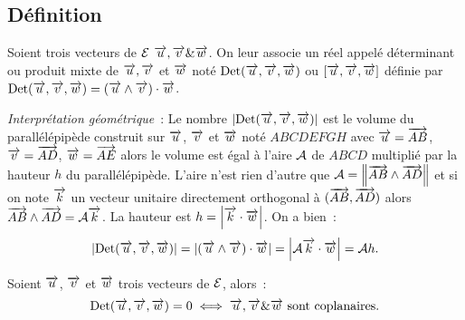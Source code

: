 \subsection{Définition}
\begin{defdef}
  Soient trois vecteurs de \(\E\) \(\vu,\vv \& \vw\). On leur associe un réel appelé déterminant ou produit mixte de \(\vu,\vv\) et \(\vw\) noté \(\Det(\vu,\vv,\vw)\) ou \([\vu,\vv,\vw]\) définie par \(\Det(\vu,\vv,\vw)=(\vu\wedge\vv)\cdot\vw\).
\end{defdef}

\emph{Interprétation géométrique}~: Le nombre \(\abs{\Det(\vu,\vv,\vw)}\) est le volume du parallélépipède construit sur \(\vu\), \(\vv\) et \(\vw\) noté \(ABCDEFGH\) avec \(\vu=\vect{AB}\), \(\vv=\vect{AD}\), \(\vw=\vect{AE}\) alors le volume est égal à l'aire \(\A\) de \(ABCD\) multiplié par la hauteur \(h\) du parallélépipède. L'aire n'est rien d'autre que \(\A=\norme{\vect{AB}\wedge\vect{AD}}\) et si on note \(\vk\) un vecteur unitaire directement orthogonal à \((\vect{AB},\vect{AD})\) alors \(\vect{AB}\wedge\vect{AD}=\A \vk\). La hauteur est \(h=\abs{\vk\cdot\vw}\). On a bien~:
\begin{equation}
  \abs{\Det(\vu,\vv,\vw)}=\abs{(\vu\wedge\vv)\cdot\vw}=\abs{\A\vk\cdot\vw}=\A h.
\end{equation}
\begin{prop}
  Soient \(\vu\), \(\vv\) et \(\vw\) trois vecteurs de \(\E\), alors~:
  \begin{equation}
    \Det(\vu,\vv,\vw)=0 \iff \vu,\vv\&\vw \text{~sont coplanaires}.
  \end{equation}
\end{prop}
